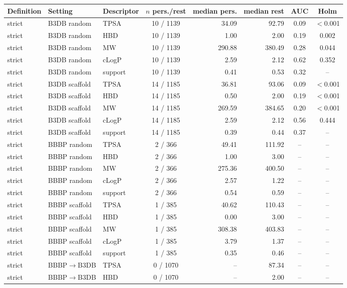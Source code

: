 \begin{tabular}{lllcrrcc}
\toprule
Definition & Setting & Descriptor & $n$ pers./rest & median pers. & median rest & AUC & Holm\\
\midrule
strict & B3DB random & TPSA & 10 / 1139 & 34.09 & 92.79 & 0.09 & $<$0.001\\
strict & B3DB random & HBD & 10 / 1139 & 1.00 & 2.00 & 0.19 & 0.002\\
strict & B3DB random & MW & 10 / 1139 & 290.88 & 380.49 & 0.28 & 0.044\\
strict & B3DB random & cLogP & 10 / 1139 & 2.59 & 2.12 & 0.62 & 0.352\\
strict & B3DB random & support & 10 / 1139 & 0.41 & 0.53 & 0.32 & --\\
strict & B3DB scaffold & TPSA & 14 / 1185 & 36.81 & 93.06 & 0.09 & $<$0.001\\
strict & B3DB scaffold & HBD & 14 / 1185 & 0.50 & 2.00 & 0.19 & $<$0.001\\
strict & B3DB scaffold & MW & 14 / 1185 & 269.59 & 384.65 & 0.20 & $<$0.001\\
strict & B3DB scaffold & cLogP & 14 / 1185 & 2.59 & 2.12 & 0.56 & 0.444\\
strict & B3DB scaffold & support & 14 / 1185 & 0.39 & 0.44 & 0.37 & --\\
strict & BBBP random & TPSA & 2 / 366 & 49.41 & 111.92 & -- & --\\
strict & BBBP random & HBD & 2 / 366 & 1.00 & 3.00 & -- & --\\
strict & BBBP random & MW & 2 / 366 & 275.36 & 400.50 & -- & --\\
strict & BBBP random & cLogP & 2 / 366 & 2.57 & 1.22 & -- & --\\
strict & BBBP random & support & 2 / 366 & 0.54 & 0.59 & -- & --\\
strict & BBBP scaffold & TPSA & 1 / 385 & 40.62 & 110.43 & -- & --\\
strict & BBBP scaffold & HBD & 1 / 385 & 0.00 & 3.00 & -- & --\\
strict & BBBP scaffold & MW & 1 / 385 & 308.38 & 403.83 & -- & --\\
strict & BBBP scaffold & cLogP & 1 / 385 & 3.79 & 1.37 & -- & --\\
strict & BBBP scaffold & support & 1 / 385 & 0.35 & 0.46 & -- & --\\
strict & BBBP$\to$B3DB & TPSA & 0 / 1070 & -- & 87.34 & -- & --\\
strict & BBBP$\to$B3DB & HBD & 0 / 1070 & -- & 2.00 & -- & --\\

\end{tabular}
